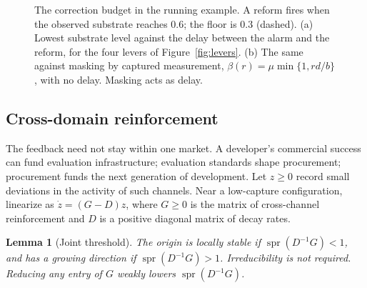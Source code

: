 \documentclass[11pt]{article}
\theoremstyle{plain}
\newtheorem{lemma}{Lemma}
\theoremstyle{definition}
\newcommand{\spr}{\operatorname{spr}}
\begin{document}
\begin{figure}[t]
\caption{The correction budget in the running example. A reform fires when the observed substrate reaches $0.6$; the floor is $0.3$ (dashed). (a) Lowest substrate level against the delay between the alarm and the reform, for the four levers of Figure~\ref{fig:levers}. (b) The same against masking by captured measurement, $\beta(r)=\mu\min\{1,rd/b\}$, with no delay. Masking acts as delay.}
\label{fig:chain}
\end{figure}

\subsection{Cross-domain reinforcement}

The feedback need not stay within one market. A developer's commercial success can fund evaluation infrastructure; evaluation standards shape procurement; procurement funds the next generation of development. Let $z\ge0$ record small deviations in the activity of such channels. Near a low-capture configuration, linearize as $\dot z=(G-D)z$, where $G\ge0$ is the matrix of cross-channel reinforcement and $D$ is a positive diagonal matrix of decay rates.

\begin{lemma}[Joint threshold]\label{lem:mmatrix}
The origin is locally stable if $\spr(D^{-1}G)<1$, and has a growing direction if $\spr(D^{-1}G)>1$. Irreducibility is not required. Reducing any entry of $G$ weakly lowers $\spr(D^{-1}G)$.
\end{lemma}
\end{document}

